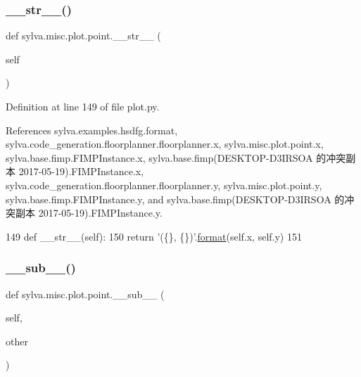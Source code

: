 \subsubsection{\texorpdfstring{\+\_\+\+\_\+str\+\_\+\+\_\+()}{\_\_str\_\_()}}
{\footnotesize\ttfamily def sylva.\+misc.\+plot.\+point.\+\_\+\+\_\+str\+\_\+\+\_\+ (\begin{DoxyParamCaption}\item[{}]{self }\end{DoxyParamCaption})}



Definition at line 149 of file plot.\+py.



References sylva.\+examples.\+hsdfg.\+format, sylva.\+code\+\_\+generation.\+floorplanner.\+floorplanner.\+x, sylva.\+misc.\+plot.\+point.\+x, sylva.\+base.\+fimp.\+F\+I\+M\+P\+Instance.\+x, sylva.\+base.\+fimp(\+D\+E\+S\+K\+T\+O\+P-\/\+D3\+I\+R\+S\+O\+A 的冲突副本 2017-\/05-\/19).\+F\+I\+M\+P\+Instance.\+x, sylva.\+code\+\_\+generation.\+floorplanner.\+floorplanner.\+y, sylva.\+misc.\+plot.\+point.\+y, sylva.\+base.\+fimp.\+F\+I\+M\+P\+Instance.\+y, and sylva.\+base.\+fimp(\+D\+E\+S\+K\+T\+O\+P-\/\+D3\+I\+R\+S\+O\+A 的冲突副本 2017-\/05-\/19).\+F\+I\+M\+P\+Instance.\+y.


\begin{DoxyCode}
149         \textcolor{keyword}{def }\_\_str\_\_(self):
150             \textcolor{keywordflow}{return} \textcolor{stringliteral}{'(\{\}, \{\})'}.\hyperlink{namespacesylva_1_1examples_1_1hsdfg_ab3510a0b8457362330aa4d9fd2209590}{format}(self.x, self.y)
151 
\end{DoxyCode}
\mbox{\label{classsylva_1_1misc_1_1plot_1_1point_a1670d6546eb506a535047d71dc8faaee}} 
\subsubsection{\texorpdfstring{\+\_\+\+\_\+sub\+\_\+\+\_\+()}{\_\_sub\_\_()}}
{\footnotesize\ttfamily def sylva.\+misc.\+plot.\+point.\+\_\+\+\_\+sub\+\_\+\+\_\+ (\begin{DoxyParamCaption}\item[{}]{self,  }\item[{}]{other }\end{DoxyParamCaption})}



